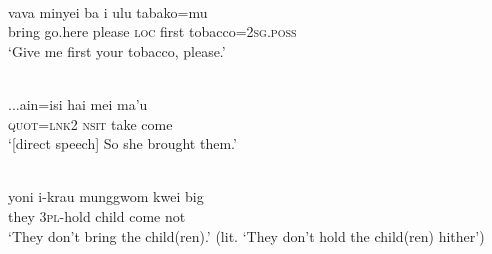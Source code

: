 \ea \label{Tajio023}
\\
\gll vava minyei ba i ulu tabako=mu \\
bring go.here please \textsc{loc} first tobacco=\textsc{2}\textsc{sg}.\textsc{poss} \\
\glft ‘Give me first your tobacco, please.'\\ 
\z

\ea \label{Makalero089}
\\
\gll ...ain=isi hai mei ma’u \\
\textsc{quot}=\textsc{lnk}\textsc{2} \textsc{nsit} take come \\
\glft `[direct speech] So she brought
them.'\\ 
\z

\ea \label{Hatam066}
\\
\gll yoni i-krau munggwom kwei big \\
they \textsc{3}\textsc{pl}-hold child come not \\
\glft `They don't bring the child(ren).' (lit. `They don't hold the child(ren) hither') \\ 
\z

